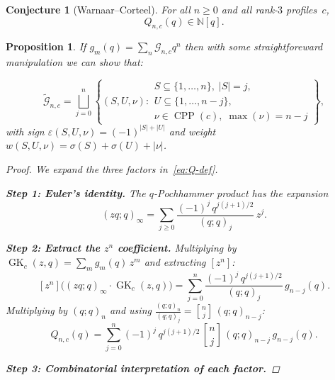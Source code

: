 \documentclass[11pt]{article}
\theoremstyle{plain}
\newtheorem{conjecture}[theorem]{Conjecture}
\newtheorem{proposition}[theorem]{Proposition}
\theoremstyle{definition}
\DeclareMathOperator{\CPP}{CPP}
\newcommand{\GK}{\operatorname{GK}}
\newcommand{\N}{\mathbb{N}}
\newcommand{\qpoch}[2]{(#1;#2)_\infty}
\newcommand{\qpochn}[3]{(#1;#2)_{#3}}
\newcommand{\qbin}[2]{\genfrac{[}{]}{0pt}{}{#1}{#2}}
\begin{document}
\begin{conjecture}[Warnaar--Corteel]
\label{conj:main}
For all $n \geq 0$ and all rank-$3$ profiles~$c$,
\[
  Q_{n,c}(q) \in \N[q].
\]
\end{conjecture}


\begin{proposition}
If $g_m(q) = \sum_n \mathcal{G}_{n,c} q^n$ then with some straightforeward manipulation we can show that:

\begin{equation}\label{eq:G-triples}
  \widetilde{\mathcal{G}}_{n,c} =
  \bigsqcup_{j=0}^{n}
  \left\{(S, U, \nu) :
    \begin{array}{l}
      S \subseteq \{1,\ldots,n\},\; |S| = j, \\[2pt]
      U \subseteq \{1,\ldots,n-j\}, \\[2pt]
      \nu \in \CPP(c),\; \max(\nu) = n - j
    \end{array}
  \right\},
\end{equation}
with sign $\varepsilon(S, U, \nu) = (-1)^{|S| + |U|}$ and weight
$w(S, U, \nu) = \sigma(S) + \sigma(U) + |\nu|$.
\begin{proof}
We expand the three factors in~\eqref{eq:Q-def}.

\medskip\noindent\textbf{Step 1: Euler's identity.}
The $q$-Pochhammer product has the expansion
\[
  \qpoch{zq}{q} = \sum_{j \geq 0} \frac{(-1)^j\, q^{j(j+1)/2}}{\qpochn{q}{q}{j}}\, z^j.
\]

\medskip\noindent\textbf{Step 2: Extract the $z^n$ coefficient.}
Multiplying by $\GK_c(z,q) = \sum_m g_m(q)\, z^m$ and extracting $[z^n]$:
\[
  [z^n]\bigl(\qpoch{zq}{q} \cdot \GK_c(z,q)\bigr)
  = \sum_{j=0}^{n} \frac{(-1)^j\, q^{j(j+1)/2}}{\qpochn{q}{q}{j}}\, g_{n-j}(q).
\]
Multiplying by $\qpochn{q}{q}{n}$ and using
$\frac{\qpochn{q}{q}{n}}{\qpochn{q}{q}{j}} = \qbin{n}{j}\,\qpochn{q}{q}{n-j}$:
\begin{equation}\label{eq:Q-expand}
  Q_{n,c}(q) = \sum_{j=0}^{n} (-1)^j\, q^{j(j+1)/2}\, \qbin{n}{j}\, \qpochn{q}{q}{n-j}\, g_{n-j}(q).
\end{equation}

\medskip\noindent\textbf{Step 3: Combinatorial interpretation of each factor.}


\end{proof}
\end{proposition}
\end{document}
